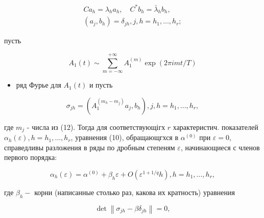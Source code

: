 \documentclass[10pt]{article}
\begin{document}
\[

\begin{gathered}

C a_{h}=\lambda_{h} a_{h}, \quad C^{*} b_{h}=\bar{\lambda}_{h} b_{h}, \\

\left(a_{j}, b_{h}\right)=\delta_{j h}, j, h=h_{1}, \ldots, h_{r} ;

\end{gathered}

\]



пусть



\[

A_{1}(t) \sim \sum_{m=-\infty}^{+\infty} A_{1}^{(m)} \exp (2 \pi i m t / T)

\]



\begin{itemize}

  \item ряд Фурье для $A_{1}(t)$ и пусть

\end{itemize}



\[

\sigma_{j h}=\left(A_{1}^{\left(m_{h}-m_{j}\right)} a_{j}, b_{h}\right), j, h=h_{1}, \ldots, h_{r},

\]



где $m_{j}$ - числа из (12). Тогда для соответствующігх $r$ характеристич. показателей $\alpha_{h}(\varepsilon), h=h_{1}, \ldots, h_{r}$, уравнения (10), обращающгхся в $\alpha^{(0)}$ при $\varepsilon=0$, справедливы разложения в ряды по дробным степеням $\varepsilon$, начинающиеся с членов первого порядка:



\[

\alpha_{h}(\varepsilon)=\alpha^{(0)}+\beta_{h} \varepsilon+O\left(\varepsilon^{1+1 / q} h\right), h=h_{1}, \ldots, h_{r},

\]



где $\beta_{h}-$ корни (написанные столько раз, какова их кратность) уравнения



\[

\operatorname{det}\left\|\sigma_{j h}-\beta \delta_{j h}\right\|=0,

\]
\end{document}
